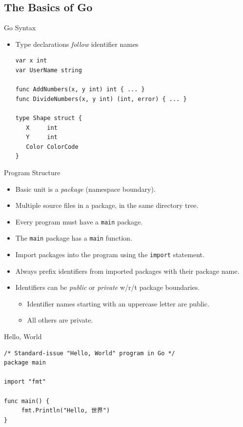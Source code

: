 \documentclass[pdf]{beamer}
\newcommand\go[1]{\texttt{#1}}
\begin{document}
\subsection{The Basics of Go}
\begin{frame}[fragile]{Go Syntax}
	\begin{itemize}
		\item Type declarations \emph{follow} identifier names
\begin{lstlisting}
var x int
var UserName string

func AddNumbers(x, y int) int { ... }
func DivideNumbers(x, y int) (int, error) { ... }

type Shape struct {
   X     int
   Y     int
   Color ColorCode
}
\end{lstlisting}
	\end{itemize}
\end{frame}
\begin{frame}{Program Structure}
	\begin{itemize}
		\item Basic unit is a \emph{package} (namespace boundary).
		\item Multiple source files in a package, in the same directory tree.
		\item Every program must have a \go{main} package.
		\item The \go{main} package has a \go{main} function.
		\item Import packages into the program using the \go{import} statement.
		\item Always prefix identifiers from imported packages with their package name.
		\item Identifiers can be \emph{public} or \emph{private} w/r/t package boundaries.
			\begin{itemize}
				\item Identifier names starting with an uppercase letter are public.
				\item All others are private.
			\end{itemize}
	\end{itemize}
\end{frame}
\begin{frame}[fragile]{Hello, World}
\begin{lstlisting}
/* Standard-issue "Hello, World" program in Go */
package main

import "fmt"

func main() {
     fmt.Println("Hello, 世界")
}
\end{lstlisting}
\end{frame}
\end{document}
